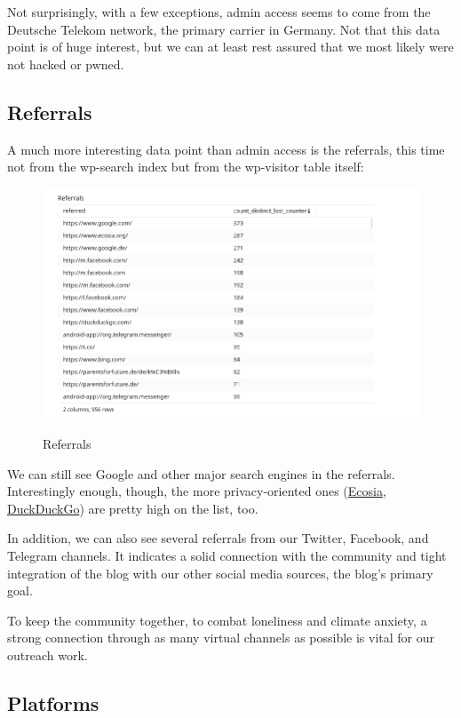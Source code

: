 Not surprisingly, with a few exceptions, admin access seems to come from the Deutsche Telekom network, the primary carrier in Germany. Not that this data point is of huge interest, but we can at least rest assured that we most likely were not hacked or pwned.

\subsection{Referrals}

A much more interesting data point than admin access is the referrals, this time not from the wp-search index but from the wp-visitor table itself:

\begin{figure}[H]
\centering
\caption {Referrals}
\includegraphics[width=\linewidth]{images/figure07.png}
\label{fig:referrals}
\end{figure}

We can still see Google and other major search engines in the referrals. Interestingly enough, though, the more privacy-oriented ones (\href{https://www.ecosia.org/?c=en}{Ecosia}, \href{https://duckduckgo.com/}{DuckDuckGo}) are pretty high on the list, too.

In addition, we can also see several referrals from our Twitter, Facebook, and Telegram channels. It indicates a solid connection with the community and tight integration of the blog with our other social media sources, the blog's primary goal.

To keep the community together, to combat loneliness and climate anxiety, a strong connection through as many virtual channels as possible is vital for our outreach work.

\subsection{Platforms}

